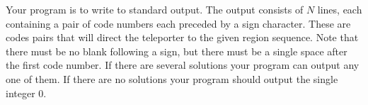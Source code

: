 Your program is to write to standard output. The output consists of $N$ lines, each
containing a pair of code numbers each preceded by a sign character. These are codes
pairs that will direct the teleporter to the given region sequence. Note that there must be
no blank following a sign, but there must be a single space after the first code number.
If there are several solutions your program can output any one of them. If there are no
solutions your program should output the single integer $0$.